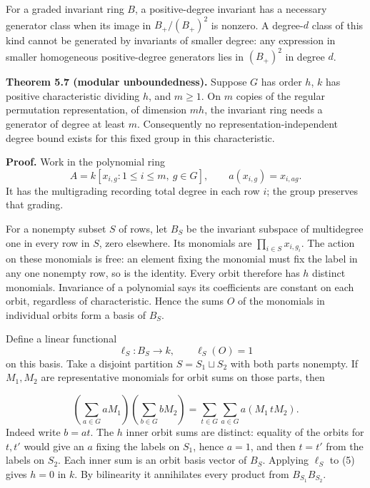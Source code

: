 \documentclass[
]{article}
\begin{document}
For a graded invariant ring \(B\), a positive-degree invariant has a
necessary generator class when its image in \(B_+/(B_+)^2\) is nonzero.
A degree-\(d\) class of this kind cannot be generated by invariants of
smaller degree: any expression in smaller homogeneous positive-degree
generators lies in \((B_+)^2\) in degree \(d\).

\protect{}\label{theorem-5-7}{}

\textbf{Theorem 5.7 (modular unboundedness).} Suppose \(G\) has order
\(h\), \(k\) has positive characteristic dividing \(h\), and \(m\geq1\).
On \(m\) copies of the regular permutation representation, of dimension
\(mh\), the invariant ring needs a generator of degree at least \(m\).
Consequently no representation-independent degree bound exists for this
fixed group in this characteristic.

\textbf{Proof.} Work in the polynomial ring \[
A=k [x_{i,g}:1\leq i\leq m,\ g\in G],\qquad
a(x_{i,g})=x_{i,ag}.
\] It has the multigrading recording total degree in each row \(i\); the
group preserves that grading.

For a nonempty subset \(S\) of rows, let \(B_S\) be the invariant
subspace of multidegree one in every row in \(S\), zero elsewhere. Its
monomials are \(\prod_{i\in S}x_{i,g_i}\). The action on these monomials
is free: an element fixing the monomial must fix the label in any one
nonempty row, so is the identity. Every orbit therefore has \(h\)
distinct monomials. Invariance of a polynomial says its coefficients are
constant on each orbit, regardless of characteristic. Hence the sums
\(O\) of the monomials in individual orbits form a basis of \(B_S\).

Define a linear functional \[
\ell_S:B_S\longrightarrow k,\qquad \ell_S(O)=1
\] on this basis. Take a disjoint partition \(S=S_1\sqcup S_2\) with
both parts nonempty. If \(M_1,M_2\) are representative monomials for
orbit sums on those parts, then
\protect{}\label{equation-5}{}

\[
\left(\sum_{a\in G}aM_1\right)
\left(\sum_{b\in G}bM_2\right)
=\sum_{t\in G}\sum_{a\in G}a(M_1\,tM_2).
\tag{5}
\] Indeed write \(b=at\). The \(h\) inner orbit sums are distinct:
equality of the orbits for \(t,t'\) would give an \(a\) fixing the
labels on \(S_1\), hence \(a=1\), and then \(t=t'\) from the labels on
\(S_2\). Each inner sum is an orbit basis vector of \(B_S\). Applying
\(\ell_S\) to (5) gives \(h=0\) in \(k\). By bilinearity it annihilates
every product from \(B_{S_1}B_{S_2}\).
\end{document}
